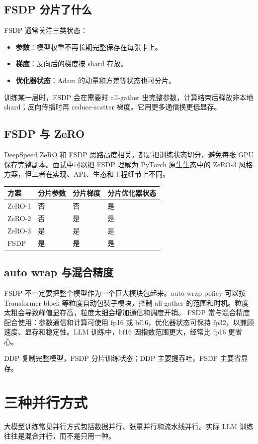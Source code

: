\subsection{FSDP 分片了什么}
FSDP 通常关注三类状态：
\begin{itemize}
  \item \textbf{参数}：模型权重不再长期完整保存在每张卡上。
  \item \textbf{梯度}：反向后的梯度按 shard 存放。
  \item \textbf{优化器状态}：Adam 的动量和方差等状态也可分片。
\end{itemize}
训练某一层时，FSDP 会在需要时 all-gather 出完整参数，计算结束后释放非本地 shard；反向传播时再 reduce-scatter 梯度。它用更多通信换更低显存。
\subsection{FSDP 与 ZeRO}
DeepSpeed ZeRO 和 FSDP 思路高度相关，都是把训练状态切分，避免每张 GPU 保存完整副本。面试中可以把 FSDP 理解为 PyTorch 原生生态中的 ZeRO-3 风格方案，但二者在实现、API、生态和工程细节上不同。
\begin{table}[htbp]
  \centering
  \begin{tabular}{llll}
    \toprule
    方案 & 分片参数 & 分片梯度 & 分片优化器状态 \\
    \midrule
    ZeRO-1 & 否 & 否 & 是 \\
    ZeRO-2 & 否 & 是 & 是 \\
    ZeRO-3 & 是 & 是 & 是 \\
    FSDP & 是 & 是 & 是 \\
    \bottomrule
  \end{tabular}
\end{table}
\subsection{auto wrap 与混合精度}
FSDP 不一定要把整个模型作为一个巨大模块包起来。auto wrap policy 可以按 Transformer block 等粒度自动包装子模块，控制 all-gather 的范围和时机。粒度太粗会导致峰值显存高，粒度太细会增加通信和调度开销。
FSDP 常与混合精度配合使用：参数通信和计算可使用 fp16 或 bf16，优化器状态可保持 fp32，以兼顾速度、显存和稳定性。LLM 训练中，bf16 因指数范围更大，经常比 fp16 更省心。
\begin{quickcard}
DDP 复制完整模型，FSDP 分片训练状态；DDP 主要提吞吐，FSDP 主要省显存。
\end{quickcard}
\section{三种并行方式}
大模型训练常见并行方式包括数据并行、张量并行和流水线并行。实际 LLM 训练往往是混合并行，而不是只用一种。
